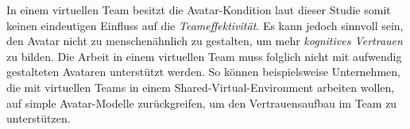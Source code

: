 \documentclass[sigchi]{acmart}
\begin{document}
In einem virtuellen Team besitzt die Avatar-Kondition laut dieser Studie somit keinen eindeutigen Einfluss auf die \textit{Teameffektivität}. Es kann jedoch sinnvoll sein, den Avatar nicht zu menschenähnlich zu gestalten, um mehr \textit{kognitives Vertrauen} zu bilden.
Die Arbeit in einem virtuellen Team muss folglich nicht mit aufwendig gestalteten Avataren unterstützt werden. So können beispielsweise Unternehmen, die mit virtuellen Teams in einem Shared-Virtual-Environment arbeiten wollen, auf simple Avatar-Modelle zurückgreifen, um den Vertrauensaufbau im Team zu unterstützen.





\appendix
\end{document}
